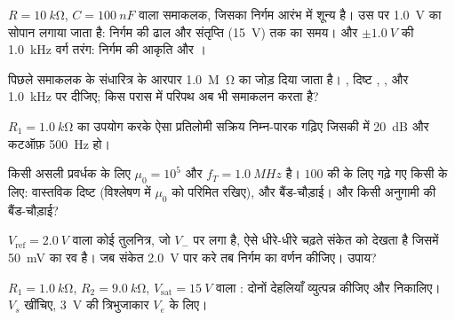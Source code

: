 \begin{exercise}[$\star\star$]\label{exo:b1:operational-amplifier:6}
$R = \qty{10}{k\ohm}$, $C = \qty{100}{nF}$ वाला समाकलक, जिसका निर्गम
आरंभ में शून्य है। उस पर \qty{1.0}{V} का सोपान लगाया जाता है: निर्गम की ढाल
और संतृप्ति (\qty{15}{V}) तक का समय। और $\pm\qty{1.0}{V}$ की \qty{1.0}{kHz}
वर्ग तरंग: निर्गम की आकृति और ।
\end{exercise}

\begin{exercise}[$\star\star$]\label{exo:b1:operational-amplifier:7}
पिछले समाकलक के संधारित्र के आरपार \qty{1.0}{M\ohm} का  जोड़ दिया
जाता है। , दिष्ट , , और \qty{1.0}{kHz} पर  दीजिए; किस परास में परिपथ अब भी
समाकलन करता है?
\end{exercise}

\begin{exercise}[$\star\star$]\label{exo:b1:operational-amplifier:8}
$R_1 = \qty{1.0}{k\ohm}$ का उपयोग करके ऐसा प्रतिलोमी सक्रिय निम्न-पारक
गढ़िए जिसकी  में  \qty{20}{dB} और कटऑफ़ \qty{500}{Hz} हो।
\end{exercise}

\begin{exercise}[$\star\star$]\label{exo:b1:operational-amplifier:9}
किसी असली प्रवर्धक के लिए $\mu_0 = 10^5$ और $f_T = \qty{1.0}{MHz}$ है।
$100$ की  के लिए गढ़े गए किसी  के लिए: वास्तविक दिष्ट
 (विश्लेषण में $\mu_0$ को परिमित रखिए), और बैंड-चौड़ाई। और किसी
अनुगामी की बैंड-चौड़ाई?
\end{exercise}

\begin{exercise}[$\star\star\star$]\label{exo:b1:operational-amplifier:10}
$V_{\mathrm{ref}} = \qty{2.0}{V}$ वाला कोई तुलनित्र, जो $V_-$ पर लगा है, ऐसे
धीरे-धीरे चढ़ते संकेत को देखता है जिसमें \qty{50}{mV} का रव है। जब संकेत \qty{2.0}{V}
पार करे तब निर्गम का वर्णन कीजिए। उपाय?
\end{exercise}

\begin{exercise}[$\star\star\star$]\label{exo:b1:operational-amplifier:11}
$R_1 = \qty{1.0}{k\ohm}$, $R_2 = \qty{9.0}{k\ohm}$,
$V_{\mathrm{sat}} = \qty{15}{V}$ वाला : दोनों देहलियाँ व्युत्पन्न कीजिए और निकालिए।
$V_s$ खींचिए,  \qty{3}{V} की त्रिभुजाकार $V_e$ के लिए।
\end{exercise}

